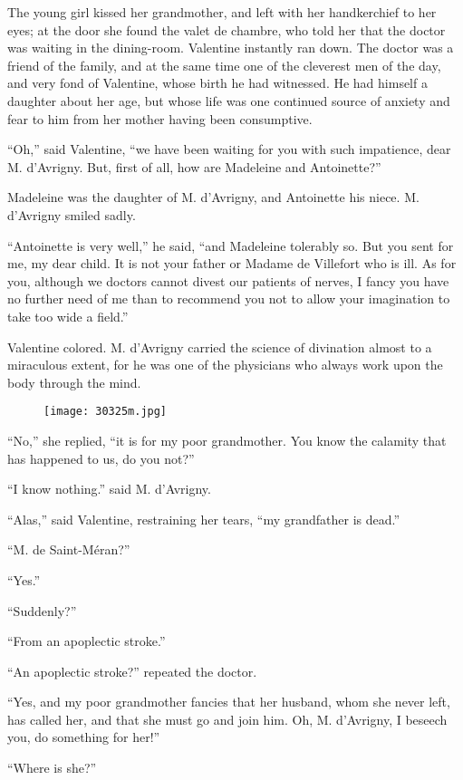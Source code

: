 The young girl kissed her grandmother, and left with her handkerchief
to her eyes; at the door she found the valet de chambre, who told her
that the doctor was waiting in the dining-room. Valentine instantly ran
down. The doctor was a friend of the family, and at the same time one
of the cleverest men of the day, and very fond of Valentine, whose
birth he had witnessed. He had himself a daughter about her age, but
whose life was one continued source of anxiety and fear to him from her
mother having been consumptive.

“Oh,” said Valentine, “we have been waiting for you with such
impatience, dear M. d’Avrigny. But, first of all, how are Madeleine and
Antoinette?”

Madeleine was the daughter of M. d’Avrigny, and Antoinette his niece.
M. d’Avrigny smiled sadly.

“Antoinette is very well,” he said, “and Madeleine tolerably so. But
you sent for me, my dear child. It is not your father or Madame de
Villefort who is ill. As for you, although we doctors cannot divest our
patients of nerves, I fancy you have no further need of me than to
recommend you not to allow your imagination to take too wide a field.”

Valentine colored. M. d’Avrigny carried the science of divination
almost to a miraculous extent, for he was one of the physicians who
always work upon the body through the mind.

\begin{figure}[ht]
\texttt{[image: 30325m.jpg]}
\end{figure}

“No,” she replied, “it is for my poor grandmother. You know the
calamity that has happened to us, do you not?”

“I know nothing.” said M. d’Avrigny.

“Alas,” said Valentine, restraining her tears, “my grandfather is
dead.”

“M. de Saint-Méran?”

“Yes.”

“Suddenly?”

“From an apoplectic stroke.”

“An apoplectic stroke?” repeated the doctor.

“Yes, and my poor grandmother fancies that her husband, whom she never
left, has called her, and that she must go and join him. Oh, M.
d’Avrigny, I beseech you, do something for her!”

“Where is she?”

